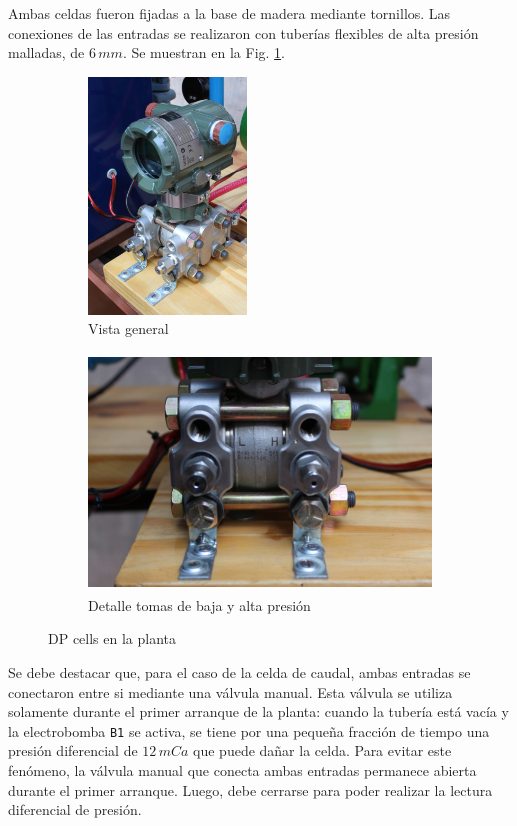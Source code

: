 Ambas celdas fueron fijadas a la base de madera mediante tornillos.
Las conexiones de las entradas se realizaron con tuberías flexibles de alta
presión malladas, de $6\,mm$. Se muestran en la Fig. \ref{fig:dpcelfig}.

\begin{figure}[t]
        \centering
        \begin{subfigure}[b]{0.31\textwidth}
        \centering
\includegraphics[height=6.3cm]
	{Cap2-DisenoEnsamblado/images/dpcell1.JPG}
	\caption{Vista general}
        \end{subfigure}%
        \hfil
        \begin{subfigure}[b]{0.69\textwidth}
        \centering
\includegraphics[height=6.3cm]
	{Cap2-DisenoEnsamblado/images/dpcell2.JPG}
	\caption{Detalle tomas de baja y alta presión}
        \end{subfigure}
        \caption{DP cells en la planta}
        \label{fig:dpcelfig}
\end{figure}

Se debe destacar que, para el caso de la celda de caudal, ambas
entradas se conectaron entre si mediante una válvula manual.
Esta válvula se utiliza solamente durante el primer arranque de la planta:
cuando la tubería está vacía y la electrobomba \verb|B1| se activa, se tiene por
una pequeña
fracción de tiempo una presión diferencial de $12\,mCa$ que puede dañar la
celda.
Para evitar este fenómeno, la válvula manual que conecta ambas entradas
permanece abierta durante el primer arranque.
Luego, debe cerrarse para poder realizar la lectura diferencial de presión.

